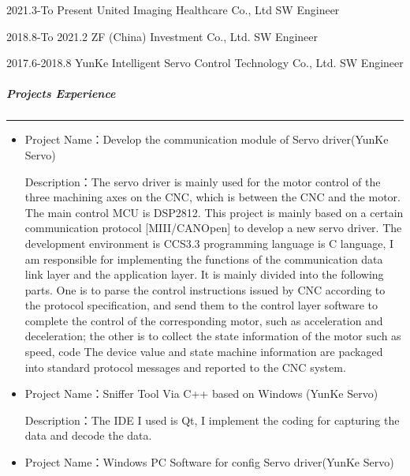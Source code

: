 \documentclass[
]{article}
\begin{document}
\begin{CJK}{UTF8}{gbsn}
       
        2021.3-To Present
        United Imaging Healthcare Co., Ltd
        SW Engineer
    
        
        2018.8-To 2021.2
         ZF (China) Investment Co., Ltd.
        SW Engineer
    
        
		2017.6-2018.8
        YunKe Intelligent Servo Control Technology Co., Ltd.
        SW Engineer
    

\hypertarget{projects-experience}{%
\subparagraph{Projects Experience}\label{projects-experience}}

\begin{center}\rule{0.5\linewidth}{0.5pt}\end{center}

\begin{itemize}
\item
  Project Name：Develop the communication module of Servo driver(YunKe
  Servo)

  Description：The servo driver is mainly used for the motor control of
  the three machining axes on the CNC, which is between the CNC and the
  motor. The main control MCU is DSP2812. This project is mainly based
  on a certain communication protocol {[}MIII/CANOpen{]} to develop a
  new servo driver. The development environment is CCS3.3 programming
  language is C language, I am responsible for implementing the
  functions of the communication data link layer and the application
  layer. It is mainly divided into the following parts. One is to parse
  the control instructions issued by CNC according to the protocol
  specification, and send them to the control layer software to complete
  the control of the corresponding motor, such as acceleration and
  deceleration; the other is to collect the state information of the
  motor such as speed, code The device value and state machine
  information are packaged into standard protocol messages and reported
  to the CNC system.
\item
  Project Name：Sniffer Tool Via C++ based on Windows (YunKe Servo)

  Description：The IDE I used is Qt, I implement the coding for
  capturing the data and decode the data.
\item
  Project Name：Windows PC Software for config Servo driver(YunKe Servo)


\end{itemize}
\end{CJK}
\end{document}

